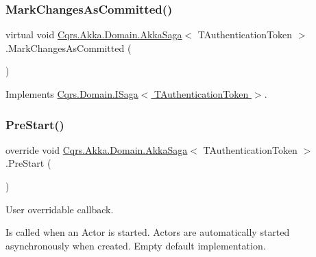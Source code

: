 \subsubsection{\texorpdfstring{Mark\+Changes\+As\+Committed()}{MarkChangesAsCommitted()}}
{\footnotesize\ttfamily virtual void \hyperlink{classCqrs_1_1Akka_1_1Domain_1_1AkkaSaga}{Cqrs.\+Akka.\+Domain.\+Akka\+Saga}$<$ T\+Authentication\+Token $>$.Mark\+Changes\+As\+Committed (\begin{DoxyParamCaption}{ }\end{DoxyParamCaption})\hspace{0.3cm}{\ttfamily [virtual]}}



Implements \hyperlink{interfaceCqrs_1_1Domain_1_1ISaga_a85c75f80bc5be4bad7f1d9f1231bfba7}{Cqrs.\+Domain.\+I\+Saga$<$ T\+Authentication\+Token $>$}.

\mbox{\label{classCqrs_1_1Akka_1_1Domain_1_1AkkaSaga_a4615beae56f595074f3ba643a890ba74}} 
\subsubsection{\texorpdfstring{Pre\+Start()}{PreStart()}}
{\footnotesize\ttfamily override void \hyperlink{classCqrs_1_1Akka_1_1Domain_1_1AkkaSaga}{Cqrs.\+Akka.\+Domain.\+Akka\+Saga}$<$ T\+Authentication\+Token $>$.Pre\+Start (\begin{DoxyParamCaption}{ }\end{DoxyParamCaption})\hspace{0.3cm}{\ttfamily [protected]}}



User overridable callback. 

Is called when an Actor is started. Actors are automatically started asynchronously when created. Empty default implementation. 

\mbox{\label{classCqrs_1_1Akka_1_1Domain_1_1AkkaSaga_a3f3cf1a10203a1eead599e7529d41613}} 
